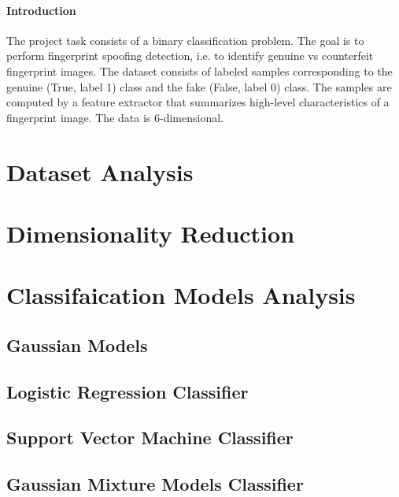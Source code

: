 \documentclass{article}
\begin{document}
    


    \paragraph{Introduction}
    The project task consists of a binary classification problem. The goal is to perform fingerprint spoofing
    detection, i.e. to identify genuine vs counterfeit fingerprint images. The dataset consists of labeled
    samples corresponding to the genuine (True, label 1) class and the fake (False, label 0) class. The
    samples are computed by a feature extractor that summarizes high-level characteristics of a fingerprint
    image. The data is 6-dimensional.



    \section{Dataset Analysis}
    




    \section{Dimensionality Reduction}
    



    \section{Classifaication Models Analysis}

    \subsection{Gaussian Models}
    
    

    \subsection{Logistic Regression Classifier}
    

    \subsection{Support Vector Machine Classifier}
    

    \subsection{Gaussian Mixture Models Classifier}
    
\end{document}
